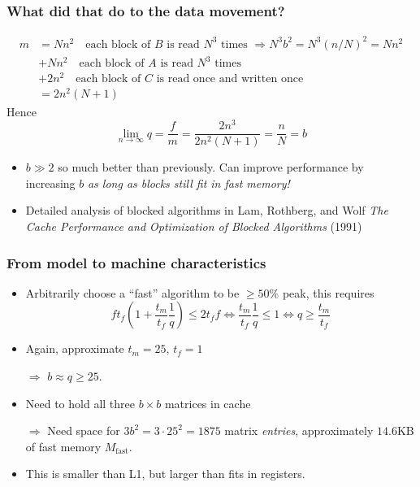 \documentclass[dvipsnames,presentation,aspectratio=169,14pt]{beamer}
\begin{document}
\begin{frame}
  \frametitle{What did that do to the data movement?}
  \begin{align*}
    m &= N n^2 \quad \text{each block of $B$ is read $N^3$ times
        $\Rightarrow N^3 b^2 = N^3 (n/N)^2 = N n^2$}\\
      &+ N n^2 \quad \text{each block of $A$ is read $N^3$ times}\\
      &+ 2 n^2 \quad \text{each block of $C$ is read once and written
        once}\\
      &= 2n^2(N+1)
  \end{align*}
  Hence
  \begin{equation*}
    \lim_{n\to\infty} q = \frac{f}{m} = \frac{2 n^3}{2n^2(N + 1)} =
    \frac{n}{N} = b
  \end{equation*}


  \begin{itemize}
  \item $b \gg 2$ so much better than previously. Can improve
    performance by increasing $b$ \emph{as long as blocks still fit in
      fast memory!}
  \item Detailed analysis of blocked algorithms in Lam, Rothberg, and
    Wolf \emph{The Cache Performance and Optimization of Blocked
      Algorithms} (1991)
  \end{itemize}
\end{frame}
\begin{frame}
  \frametitle{From model to machine characteristics}
  \begin{itemize}
  \item Arbitrarily choose a ``fast'' algorithm to be $\ge 50\%$ peak,
    this requires
    \begin{equation*}
      f t_f \left(1 + \frac{t_m}{t_f}\frac{1}{q}\right) \le 2 t_f f \Leftrightarrow \frac{t_m}{t_f}\frac{1}{q} \le 1
      \Leftrightarrow q \ge \frac{t_m}{t_f}
    \end{equation*}
  \item Again, approximate $t_m = 25$, $t_f = 1$
  \item[$\Rightarrow$] $b \approx q \ge 25$.
  \item Need to hold all three $b \times b$ matrices in cache

  \item[$\Rightarrow$] Need space for $3 b^2 = 3 \cdot 25^2 = 1875$
    matrix \emph{entries}, approximately $14.6$KB of fast memory $M_\text{fast}$.
  \item This is smaller than L1, but larger than fits in registers.
  \end{itemize}
\end{frame}
\end{document}

